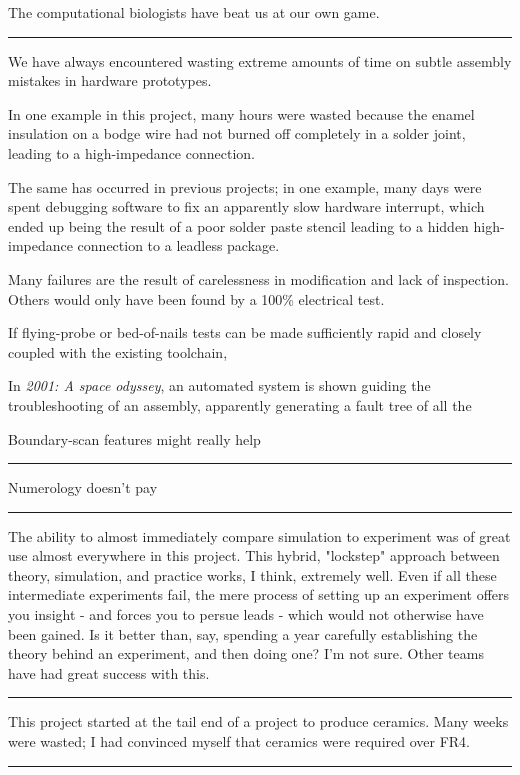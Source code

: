 \documentclass[paper.tex]{subfiles}
\begin{document}
The computational biologists have beat us at our own game.

\rule{\linewidth}{0.2pt}

We have always encountered wasting extreme amounts of time on subtle assembly mistakes in hardware prototypes. 

In one example in this project, many hours were wasted because the enamel insulation on a bodge wire had not burned off completely in a solder joint, leading to a high-impedance connection.

The same has occurred in previous projects; in one example, many days were spent debugging software to fix an apparently slow hardware interrupt, which ended up being the result of a poor solder paste stencil leading to a hidden high-impedance connection to a leadless package.

Many failures are the result of carelessness in modification and lack of inspection. Others would only have been found by a 100\% electrical test.

If flying-probe or bed-of-nails tests can be made sufficiently rapid and closely coupled with the existing toolchain, 

In {\it 2001: A space odyssey}, an automated system is shown guiding the troubleshooting of an assembly, apparently generating a fault tree of all the 

Boundary-scan features might really help 

\rule{\linewidth}{0.2pt}

Numerology doesn't pay

\rule{\linewidth}{0.2pt}

The ability to almost immediately compare simulation to experiment was of great use almost everywhere in this project. This hybrid, "lockstep" approach between theory, simulation, and practice works, I think, extremely well. Even if all these intermediate experiments fail, the mere process of setting up an experiment offers you insight - and forces you to persue leads - which would not otherwise have been gained. Is it better than, say, spending a year carefully establishing the theory behind an experiment, and then doing one? I'm not sure. Other teams have had great success with this.

\rule{\linewidth}{0.2pt}

This project started at the tail end of a project to produce ceramics. Many weeks were wasted; I had convinced myself that ceramics were required over FR4. 

\rule{\linewidth}{0.2pt}
\end{document}
